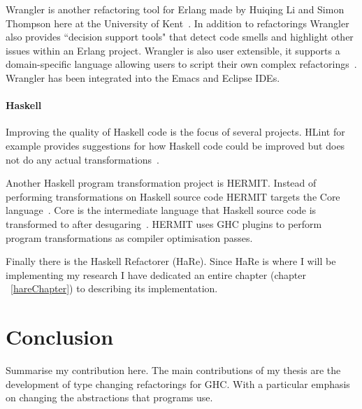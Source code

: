 Wrangler is another refactoring tool for Erlang made by Huiqing Li and Simon Thompson here at the University of Kent~\citep{refacTools}. In addition to refactorings Wrangler also provides ``decision support tools" that detect code smells and highlight other issues within an Erlang project. Wrangler is also user extensible, it supports a domain-specific language allowing users to script their own complex refactorings~\citep{refacTools}. Wrangler has been integrated into the Emacs and Eclipse IDEs.

\subsubsection{Haskell}

Improving the quality of Haskell code is the focus of several projects. HLint for example provides suggestions for how Haskell code could be improved but does not do any actual transformations~\citep{hlint}.

Another Haskell program transformation project is HERMIT. Instead of performing transformations on Haskell source code HERMIT targets the Core language~\citep{hermit}. Core is the intermediate language that Haskell source code is transformed to after desugaring~\citep{ghcDesign}. HERMIT uses GHC plugins to perform program transformations as compiler optimisation passes. 

Finally there is the Haskell Refactorer (HaRe). Since HaRe is where I will be implementing my research I have dedicated an entire chapter (chapter ~\ref{hareChapter}) to describing its implementation. 


\chapter{Conclusion}
Summarise my contribution here. The main contributions of my thesis are the development of type changing refactorings for GHC. With a particular emphasis on changing the abstractions that programs use.



\cleardoublepage
{}
\label{index}
\printindex


